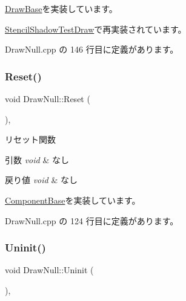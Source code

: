 \mbox{\hyperlink{class_draw_base_a9bf55f6b67735e0bff42d749f43826c1}{Draw\+Base}}を実装しています。



\mbox{\hyperlink{class_stencil_shadow_test_draw_ab798b88896ba3f0b3de057dff49823be}{Stencil\+Shadow\+Test\+Draw}}で再実装されています。



 Draw\+Null.\+cpp の 146 行目に定義があります。

\mbox{\label{class_draw_null_a1e295d7fa2d2b78cfe3121e0a0fcd799}} 
\subsubsection{\texorpdfstring{Reset()}{Reset()}}
{\footnotesize\ttfamily void Draw\+Null\+::\+Reset (\begin{DoxyParamCaption}{ }\end{DoxyParamCaption})\hspace{0.3cm}{\ttfamily [override]}, {\ttfamily [virtual]}}



リセット関数 


\begin{DoxyParams}{引数}
{\em void} & なし \\
\hline
\end{DoxyParams}

\begin{DoxyRetVals}{戻り値}
{\em void} & なし \\
\hline
\end{DoxyRetVals}


\mbox{\hyperlink{class_component_base_a484df9edcbe83b1a98aacc55b50bfdda}{Component\+Base}}を実装しています。



 Draw\+Null.\+cpp の 124 行目に定義があります。

\mbox{\label{class_draw_null_a6e81d63efab7333e8d0e8af99362a4d9}} 
\subsubsection{\texorpdfstring{Uninit()}{Uninit()}}
{\footnotesize\ttfamily void Draw\+Null\+::\+Uninit (\begin{DoxyParamCaption}{ }\end{DoxyParamCaption})\hspace{0.3cm}{\ttfamily [override]}, {\ttfamily [virtual]}}



